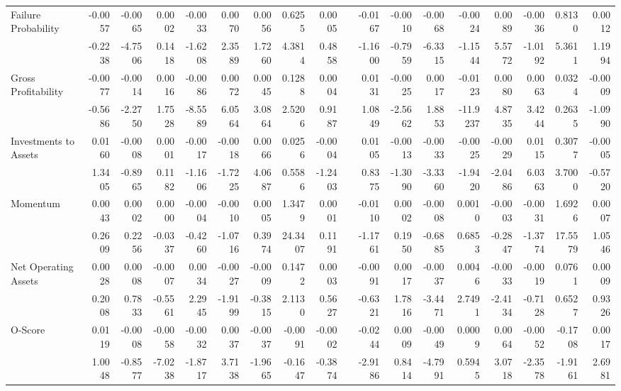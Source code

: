 \begin{table}[h]
{\begin{tabular}{lrrrrrrrrrrrrrrrrr}
      Failure Probability & -0.0057 & -0.0065 & 0.0002 & -0.0033 & 0.0070 & 0.0056 & 0.6255 & 0.0005 &       & -0.0167 & -0.0010 & -0.0068 & -0.0024 & 0.0089 & -0.0036 & 0.8130 & 0.0012 \\
            & -0.2238 & -4.7506 & 0.1418 & -1.6208 & 2.3589 & 1.7260 & 4.3814 & 0.4858 &       & -1.1600 & -0.7959 & -6.3315 & -1.1544 & 5.5772 & -1.0192 & 5.3611 & 1.1994 \\
      Gross Profitability & -0.0077 & -0.0014 & 0.0016 & -0.0086 & 0.0072 & 0.0045 & 0.1288 & 0.0004 &       & 0.0131 & -0.0025 & 0.0017 & -0.0123 & 0.0080 & 0.0063 & 0.0324 & -0.0009 \\
            & -0.5686 & -2.2750 & 1.7528 & -8.5589 & 6.0564 & 3.0864 & 2.5206 & 0.9187 &       & 1.0849 & -2.5662 & 1.8853 & -11.9237 & 4.8735 & 3.4244 & 0.2635 & -1.0990 \\
      Investments to Assets & 0.0160 & -0.0008 & 0.0001 & -0.0017 & -0.0018 & 0.0066 & 0.0256 & -0.0004 &       & 0.0105 & -0.0013 & -0.0033 & -0.0025 & -0.0029 & 0.0115 & 0.3077 & -0.0005 \\
            & 1.3405 & -0.8965 & 0.1182 & -1.1606 & -1.7225 & 4.0687 & 0.5586 & -1.2403 &       & 0.8375 & -1.3090 & -3.3360 & -1.9420 & -2.0486 & 6.0363 & 3.7000 & -0.5720 \\
      Momentum & 0.0043 & 0.0002 & 0.0000 & -0.0004 & -0.0010 & 0.0005 & 1.3479 & 0.0001 &       & -0.0110 & 0.0002 & -0.0008 & 0.0010 & -0.0003 & -0.0031 & 1.6926 & 0.0007 \\
            & 0.2609 & 0.2256 & -0.0337 & -0.4260 & -1.0716 & 0.3974 & 24.3407 & 0.1191 &       & -1.1761 & 0.1950 & -0.6885 & 0.6853 & -0.2847 & -1.3774 & 17.5579 & 1.0546 \\
      Net Operating Assets & 0.0028 & 0.0008 & -0.0007 & 0.0034 & -0.0027 & -0.0009 & 0.1472 & 0.0003 &       & -0.0091 & 0.0017 & -0.0037 & 0.0046 & -0.0033 & -0.0019 & 0.0761 & 0.0009 \\
            & 0.2008 & 0.7833 & -0.5561 & 2.2945 & -1.9199 & -0.3815 & 2.1130 & 0.5627 &       & -0.6321 & 1.7816 & -3.4471 & 2.7491 & -2.4134 & -0.7128 & 0.6527 & 0.9326 \\
      O-Score & 0.0119 & -0.0008 & -0.0058 & -0.0032 & 0.0037 & -0.0037 & -0.0091 & -0.0002 &       & -0.0244 & 0.0009 & -0.0049 & 0.0009 & 0.0064 & -0.0052 & -0.1708 & 0.0017 \\
            & 1.0048 & -0.8577 & -7.0238 & -1.8717 & 3.7138 & -1.9665 & -0.1647 & -0.3874 &       & -2.9186 & 0.8414 & -4.7991 & 0.5945 & 3.0718 & -2.3578 & -1.9161 & 2.6981 \\

\end{tabular}}
\end{table}
